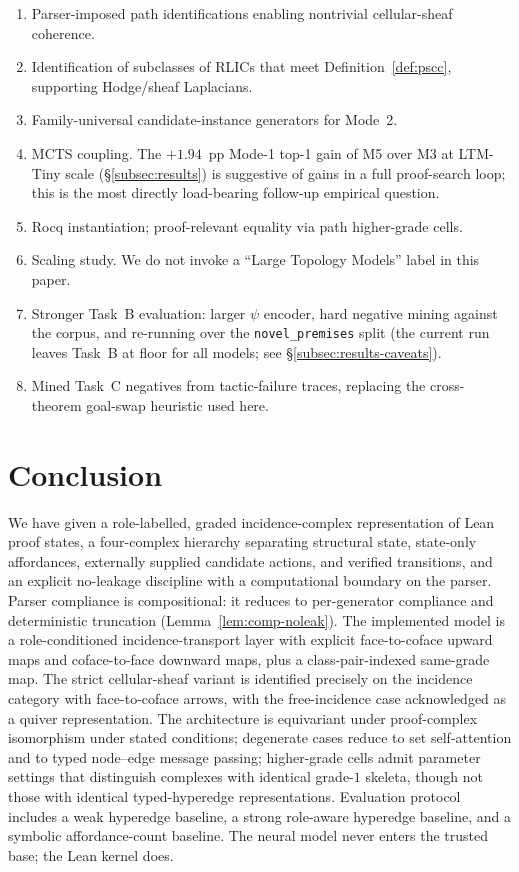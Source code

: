 \documentclass[11pt]{article}
\theoremstyle{definition}
\theoremstyle{plain}
\begin{document}
\begin{enumerate}
\item Parser-imposed path identifications enabling nontrivial cellular-sheaf coherence.
\item Identification of subclasses of RLICs that meet Definition~\ref{def:pscc}, supporting Hodge/sheaf Laplacians.
\item Family-universal candidate-instance generators for Mode~2.
\item MCTS coupling. The $+1.94$~pp Mode-1 top-1 gain of M5 over M3 at LTM-Tiny scale (\S\ref{subsec:results}) is suggestive of gains in a full proof-search loop; this is the most directly load-bearing follow-up empirical question.
\item Rocq instantiation; proof-relevant equality via path higher-grade cells.
\item Scaling study. We do not invoke a ``Large Topology Models'' label in this paper.
\item Stronger Task~B evaluation: larger $\psi$ encoder, hard negative mining against the corpus, and re-running over the \texttt{novel\_premises} split (the current run leaves Task~B at floor for all models; see \S\ref{subsec:results-caveats}).
\item Mined Task~C negatives from tactic-failure traces, replacing the cross-theorem goal-swap heuristic used here.
\end{enumerate}

\section{Conclusion}

We have given a role-labelled, graded incidence-complex representation of Lean proof states, a four-complex hierarchy separating structural state, state-only affordances, externally supplied candidate actions, and verified transitions, and an explicit no-leakage discipline with a computational boundary on the parser. Parser compliance is compositional: it reduces to per-generator compliance and deterministic truncation (Lemma~\ref{lem:comp-noleak}). The implemented model is a role-conditioned incidence-transport layer with explicit face-to-coface upward maps and coface-to-face downward maps, plus a class-pair-indexed same-grade map. The strict cellular-sheaf variant is identified precisely on the incidence category with face-to-coface arrows, with the free-incidence case acknowledged as a quiver representation. The architecture is equivariant under proof-complex isomorphism under stated conditions; degenerate cases reduce to set self-attention and to typed node--edge message passing; higher-grade cells admit parameter settings that distinguish complexes with identical grade-$1$ skeleta, though not those with identical typed-hyperedge representations. Evaluation protocol includes a weak hyperedge baseline, a strong role-aware hyperedge baseline, and a symbolic affordance-count baseline. The neural model never enters the trusted base; the Lean kernel does.
\end{document}
